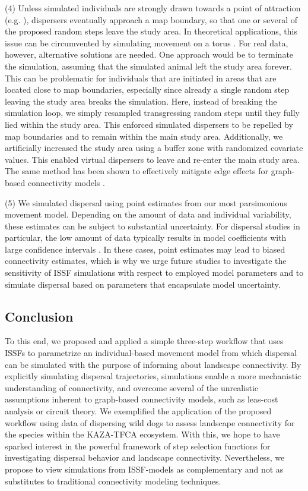 \documentclass[abstract=on,10pt,a4paper,bibliography=totocnumbered]{article}
\begin{document}
(4) Unless simulated individuals are strongly drawn towards a point of
attraction (e.g. \cite{Signer.2017}), dispersers eventually approach a map
boundary, so that one or several of the proposed random steps leave the study
area. In theoretical applications, this issue can be circumvented by simulating
movement on a torus \citep{Hodel.2021b}. For real data, however, alternative
solutions are needed. One approach would be to terminate the simulation,
assuming that the simulated animal left the study area forever. This can be
problematic for individuals that are initiated in areas that are located close
to map boundaries, especially since already a single random step leaving the
study area breaks the simulation. Here, instead of breaking the simulation loop,
we simply resampled transgressing random steps until they fully lied within the
study area. This enforced simulated dispersers to be repelled by map boundaries
and to remain within the main study area. Additionally, we artificially
increased the study area using a buffer zone with randomized covariate values.
This enabled virtual dispersers to leave and re-enter the main study area. The
same method has been shown to effectively mitigate edge effects for graph-based
connectivity models \citep{Koen.2010}.

(5) We simulated dispersal using point estimates from our most parsimonious
movement model. Depending on the amount of data and individual variability,
these estimates can be subject to substantial uncertainty. For dispersal studies
in particular, the low amount of data typically results in model coefficients
with large confidence intervals \citep{Wiegand.2003, KramerSchadt.2007}. In
these cases, point estimates may lead to biased connectivity estimates, which is
why we urge future studies to investigate the sensitivity of ISSF simulations
with respect to employed model parameters and to simulate dispersal based on
parameters that encapsulate model uncertainty.

\subsection{Conclusion}
To this end, we proposed and applied a simple three-step workflow that uses
ISSFs to parametrize an individual-based movement model from which dispersal can
be simulated with the purpose of informing about landscape connectivity. By
explicitly simulating dispersal trajectories, simulations enable a more
mechanistic understanding of connectivity, and overcome several of the
unrealistic assumptions inherent to graph-based connectivity models, such as
leas-cost analysis or circuit theory. We exemplified the application of the
proposed workflow using data of dispersing wild dogs to assess landscape
connectivity for the species within the KAZA-TFCA ecosystem. With this, we hope
to have sparked interest in the powerful framework of step selection functions
for investigating dispersal behavior and landscape connectivity. Nevertheless,
we propose to view simulations from ISSF-models as complementary and not as
substitutes to traditional connectivity modeling techniques.
\end{document}
